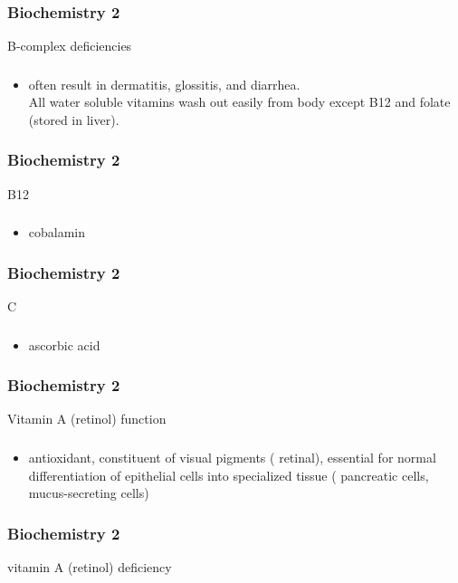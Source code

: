 \documentclass[11pt]{beamer}
\begin{document}
\begin{frame}
 \frametitle{Biochemistry 2}
B-complex deficiencies 
\end{frame}

\begin{frame}
 \frametitle{}
\begin{itemize}
\item often result in dermatitis, glossitis, and diarrhea. \\ All water soluble vitamins wash out easily from body except B12 and folate (stored in liver).
\end{itemize}
\end{frame}

\begin{frame}
 \frametitle{Biochemistry 2}
B12 
\end{frame}

\begin{frame}
 \frametitle{}
\begin{itemize}
\item cobalamin
\end{itemize}
\end{frame}

\begin{frame}
 \frametitle{Biochemistry 2}
C
\end{frame}

\begin{frame}
 \frametitle{}
\begin{itemize}
\item ascorbic acid 
\end{itemize}
\end{frame}

\begin{frame}
 \frametitle{Biochemistry 2}
Vitamin A (retinol) function 
\end{frame}

\begin{frame}
 \frametitle{}
\begin{itemize}
\item antioxidant, constituent of visual pigments ( retinal), essential for normal differentiation of epithelial cells into specialized tissue ( pancreatic cells, mucus-secreting cells) 
\end{itemize}
\end{frame}

\begin{frame}
 \frametitle{Biochemistry 2}
vitamin A (retinol) deficiency  
\end{frame}
\end{document}
